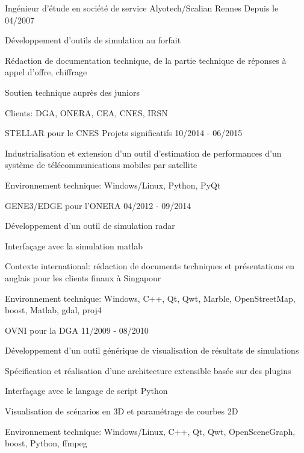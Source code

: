 \begin{cventries}
  \cventry
    {Ingénieur d'étude en société de service}
    {Alyotech/Scalian}
    {Rennes}
    {Depuis le 04/2007}
    {
      \begin{cvitems}
        \item {Développement d'outils de simulation au forfait}
        \item {Rédaction de documentation technique, de la partie technique de réponses à appel d'offre, chiffrage}
        \item {Soutien technique auprès des juniors}
        \item {Clients: DGA, ONERA, CEA, CNES, IRSN}
      \end{cvitems}
    }

  \cventry
    {STELLAR pour le CNES}
    {Projets significatifs}
    {}
    {10/2014 - 06/2015}
    {
      \begin{cvitems}
        \item {Industrialisation et extension d’un outil d’estimation de performances d’un 
			   système de télécommunications mobiles par satellite}
        \item {Environnement technique: Windows/Linux, Python, PyQt}
      \end{cvitems}
    }

  \cventry
    {GENE3/EDGE pour l'ONERA}
    {}
    {}
    {04/2012 - 09/2014}
    {
      \begin{cvitems}
        \item {Développement d’un outil de simulation radar}
        \item {Interfaçage avec la simulation matlab}
		\item {Contexte international: rédaction de documents techniques et 
	  		   présentations en anglais pour les clients finaux à Singapour}
		\item {Environnement technique: Windows, C++, Qt, Qwt, Marble, OpenStreetMap, 
	  		   boost, Matlab, gdal, proj4}
      \end{cvitems}
    }

  \cventry
    {OVNI pour la DGA}
    {}
    {}
    {11/2009 - 08/2010}
    {
      \begin{cvitems}
        \item {Développement d'un outil générique de visualisation de résultats de simulations}
        \item {Spécification et réalisation d'une architecture extensible basée sur des plugins}
        \item {Interfaçage avec le langage de script Python}
        \item {Visualisation de scénarios en 3D et paramétrage de courbes 2D}
		\item {Environnement technique: Windows/Linux, C++, Qt, Qwt, OpenSceneGraph, 
			boost, Python, ffmpeg}
      \end{cvitems}
    }


\end{cventries}
